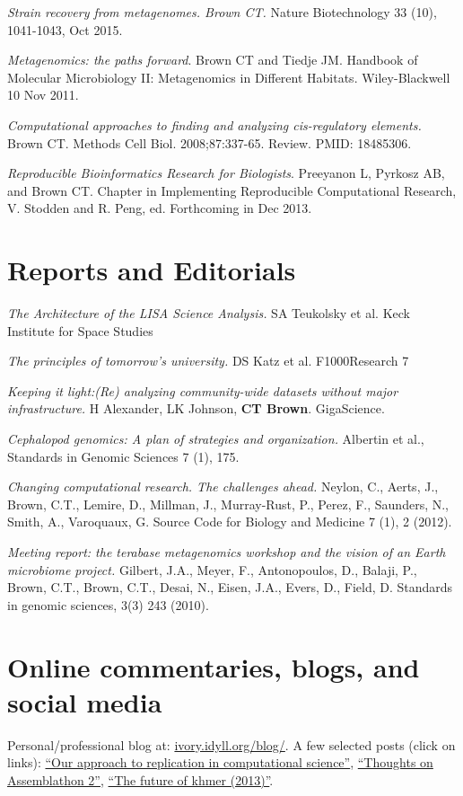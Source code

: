 \documentclass[margin,line]{resume}
\begin{document}
\begin{resume}
{\em Strain recovery from metagenomes. Brown CT.} Nature Biotechnology
33 (10), 1041-1043, Oct 2015.

{\em Metagenomics: the paths forward}.  Brown CT and Tiedje JM.
Handbook of Molecular Microbiology II: Metagenomics in Different
Habitats.  Wiley-Blackwell 10 Nov 2011.

{\em Computational approaches to finding and analyzing cis-regulatory elements.} 
Brown CT. Methods Cell Biol. 2008;87:337-65. Review.
PMID: 18485306.

{\em Reproducible Bioinformatics Research for Biologists}.  Preeyanon
L, Pyrkosz AB, and Brown CT. Chapter in Implementing Reproducible
Computational Research, V. Stodden and R. Peng, ed.  Forthcoming in
Dec 2013.

\section{\mysidestyle Reports and Editorials}

{\em The Architecture of the LISA Science Analysis.} SA Teukolsky et al.
Keck Institute for Space Studies

{\em The principles of tomorrow's university.} DS Katz et al. F1000Research 7

{\em Keeping it light:(Re) analyzing community-wide datasets without major infrastructure.} H Alexander, LK Johnson, {\bf CT Brown}.
GigaScience.

{\em Cephalopod genomics: A plan of strategies and organization.} Albertin et al., Standards in Genomic Sciences 7 (1), 175.

{\em Changing computational research. The challenges ahead.}
Neylon, C., Aerts, J., Brown, C.T., Lemire, D., Millman, J., Murray-Rust, P., Perez, F., Saunders, N., Smith, A., Varoquaux, G.
Source Code for Biology and Medicine 7 (1), 2 (2012).

{\em Meeting report: the terabase metagenomics workshop and the vision of an Earth microbiome project.}
Gilbert, J.A., Meyer, F., Antonopoulos, D., Balaji, P., Brown, C.T., Brown, C.T., Desai, N., Eisen, J.A., Evers, D., Field, D. Standards in genomic sciences, 3(3) 243 (2010).

\section{\mysidestyle Online commentaries, blogs, and social media}

Personal/professional blog at: \href{http://ivory.idyll.org/blog/}{ivory.idyll.org/blog/}.  A few selected posts (click on links): \href{http://ivory.idyll.org/blog/replication-i.html}{``Our approach to replication in computational science''}, \href{http://ivory.idyll.org/blog/thoughts-on-assemblathon-2.html}{``Thoughts on Assemblathon 2''}, \href{http://ivory.idyll.org/blog/the-future-of-khmer-2013-version.html}{``The future of khmer (2013)''}.


\end{resume}
\end{document}
